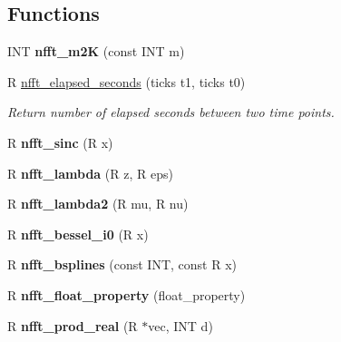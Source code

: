 \subsection*{Functions}
\begin{DoxyCompactItemize}
\item 
\hypertarget{group__nfftutil_gaf6947a72a3f08719875bc853b382ea3f}{I\-N\-T {\bfseries nfft\-\_\-m2\-K} (const I\-N\-T m)}\label{group__nfftutil_gaf6947a72a3f08719875bc853b382ea3f}

\item 
R \hyperlink{group__nfftutil_ga6991b7df7efdecc93da6e4426e106d67}{nfft\-\_\-elapsed\-\_\-seconds} (ticks t1, ticks t0)
\begin{DoxyCompactList}\small\item\em Return number of elapsed seconds between two time points. \end{DoxyCompactList}\item 
\hypertarget{group__nfftutil_ga803eb48489ddded05761f2a95b637228}{R {\bfseries nfft\-\_\-sinc} (R x)}\label{group__nfftutil_ga803eb48489ddded05761f2a95b637228}

\item 
\hypertarget{group__nfftutil_gac8ee15eb61c6f8b2f2d6df870a20903b}{R {\bfseries nfft\-\_\-lambda} (R z, R eps)}\label{group__nfftutil_gac8ee15eb61c6f8b2f2d6df870a20903b}

\item 
\hypertarget{group__nfftutil_gad2926599dee8e4bbb3146822e949a98a}{R {\bfseries nfft\-\_\-lambda2} (R mu, R nu)}\label{group__nfftutil_gad2926599dee8e4bbb3146822e949a98a}

\item 
\hypertarget{group__nfftutil_ga936736013d3dae6745d4af77732f887b}{R {\bfseries nfft\-\_\-bessel\-\_\-i0} (R x)}\label{group__nfftutil_ga936736013d3dae6745d4af77732f887b}

\item 
\hypertarget{group__nfftutil_gac484b19af95ed6c342b294e4f576e496}{R {\bfseries nfft\-\_\-bsplines} (const I\-N\-T, const R x)}\label{group__nfftutil_gac484b19af95ed6c342b294e4f576e496}

\item 
\hypertarget{group__nfftutil_ga5fc13f95636992eb63459e447af2497f}{R {\bfseries nfft\-\_\-float\-\_\-property} (float\-\_\-property)}\label{group__nfftutil_ga5fc13f95636992eb63459e447af2497f}

\item 
\hypertarget{group__nfftutil_gaca1a5db966f47347a11b195064438d64}{R {\bfseries nfft\-\_\-prod\-\_\-real} (R $\ast$vec, I\-N\-T d)}\label{group__nfftutil_gaca1a5db966f47347a11b195064438d64}


\end{DoxyCompactItemize}
